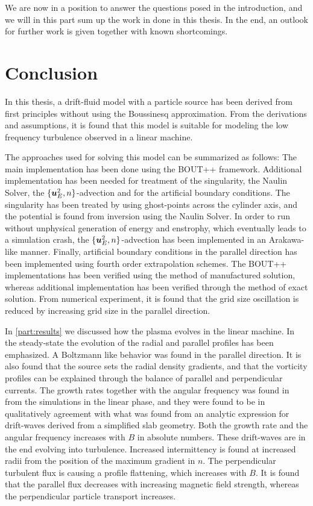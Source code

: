 %
We are now in a position to answer the questions posed in the introduction, and we will in this part sum up the work in done in this thesis.
In the end, an outlook for further work is given together with known shortcomings.

\section*{Conclusion}
%
In this thesis, a drift-fluid model with a particle source has been derived from first principles without using the Boussinesq approximation.
From the derivations and assumptions, it is found that this model is suitable for modeling the low frequency turbulence observed in a linear machine.

The approaches used for solving this model can be summarized as follows:
The main implementation has been done using the BOUT++ framework.
Additional implementation has been needed for treatment of the singularity, the Naulin Solver, the $\{\boldsymbol{u}_E^2,n\}$-advection and for the artificial boundary conditions.
The singularity has been treated by using ghost-points across the cylinder axis, and the potential is found from inversion using the Naulin Solver.
In order to run without unphysical generation of energy and enstrophy, which eventually leads to a simulation crash, the $\{\boldsymbol{u}_E^2,n\}$-advection has been implemented in an Arakawa-like manner.
Finally, artificial boundary conditions in the parallel direction has been implemented using fourth order extrapolation schemes.
The BOUT++ implementations has been verified using the method of manufactured solution, whereas additional implementation has been verified through the method of exact solution.
From numerical experiment, it is found that the grid size oscillation is reduced by increasing grid size in the parallel direction.

In \cref{part:results} we discussed how the plasma evolves in the linear machine.
In the steady-state the evolution of the radial and parallel profiles has been emphasized.
A Boltzmann like behavior was found in the parallel direction.
It is also found that the source sets the radial density gradients, and that the vorticity profiles can be explained through the balance of parallel and perpendicular currents.
The growth rates together with the angular frequency was found in from the simulations in the linear phase, and they were found to be in qualitatively agreement with what was found from an analytic expression for drift-waves derived from a simplified slab geometry.
Both the growth rate and the angular frequency increases with $B$ in absolute numbers.
These drift-waves are in the end evolving into turbulence.
Increased intermittency is found at increased radii from the position of the maximum gradient in $n$.
The perpendicular turbulent flux is causing a profile flattening, which increases with $B$.
It is found that the parallel flux decreases with increasing magnetic field strength, whereas the perpendicular particle transport increases.

